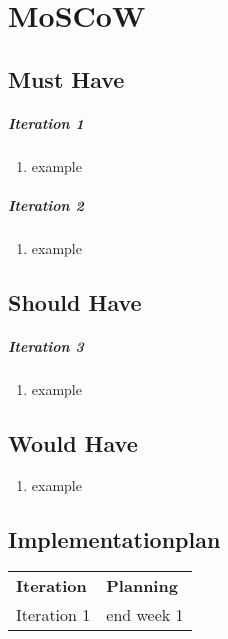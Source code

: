 \chapter{MoSCoW}
\thispagestyle{fancy}

\section{Must Have}
\paragraph{Iteration 1}

\begin{enumerate}[noitemsep]
 	 \item example
\end{enumerate}

\paragraph{Iteration 2}
\begin{enumerate}
	\item example
\end{enumerate}


\section{Should Have}
\paragraph{Iteration 3}
\begin{enumerate}
	\item example
\end{enumerate}


\section{Would Have}
\begin{enumerate}
	\item example
\end{enumerate}


\section{Implementationplan}

\vspace{10 mm}
\begin{centering}
\begin{supertabular}{p{0.3\textwidth} l}
\textbf{Iteration}	& \textbf{Planning}\\	
Iteration 1 		& end week 1\\	
\end{supertabular}
\end{centering}